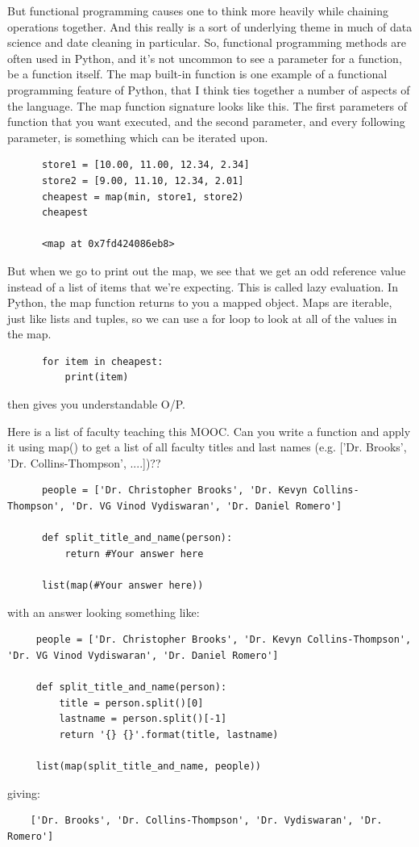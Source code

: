\documentclass[11pt]{article}
\begin{document}
    But functional programming causes one to think more heavily while
    chaining operations together. And this really is a sort of underlying
    theme in much of data science and date cleaning in particular. So,
    functional programming methods are often used in Python, and it's not
    uncommon to see a parameter for a function, be a function itself. The
    map built-in function is one example of a functional programming
    feature of Python, that I think ties together a number of aspects of
    the language. The map function signature looks like this. The first
    parameters of function that you want executed, and the second
    parameter, and every following parameter, is something which can be
    iterated upon.

    \begin{lstlisting}
      store1 = [10.00, 11.00, 12.34, 2.34]
      store2 = [9.00, 11.10, 12.34, 2.01]
      cheapest = map(min, store1, store2)
      cheapest

      <map at 0x7fd424086eb8>
    \end{lstlisting}
    But when we go to print out the map, we see that we get an odd
    reference value instead of a list of items that we're expecting. This
    is called lazy evaluation. In Python, the map function returns to you
    a mapped object. Maps are iterable, just like lists and tuples, so we
    can use a for loop to look at all of the values in the map.

    \begin{lstlisting}
      for item in cheapest:
          print(item)
    \end{lstlisting}
    then gives you understandable O/P. 

    \newpage
    \medskip\medskip
    \noindent
    Here is a list of faculty teaching this MOOC. Can you write a
    function and apply it using map() to get a list of all faculty titles
    and last names (e.g. ['Dr. Brooks', 'Dr. Collins-Thompson', ....])??
    \begin{lstlisting}
      people = ['Dr. Christopher Brooks', 'Dr. Kevyn Collins-Thompson', 'Dr. VG Vinod Vydiswaran', 'Dr. Daniel Romero']
      
      def split_title_and_name(person):
          return #Your answer here

      list(map(#Your answer here))
    \end{lstlisting}

    \noindent 
    with an answer looking something like:
    \begin{lstlisting}
     people = ['Dr. Christopher Brooks', 'Dr. Kevyn Collins-Thompson', 'Dr. VG Vinod Vydiswaran', 'Dr. Daniel Romero']
      
     def split_title_and_name(person):
         title = person.split()[0]
         lastname = person.split()[-1]
         return '{} {}'.format(title, lastname)

     list(map(split_title_and_name, people))
    \end{lstlisting}
    giving:
    \begin{lstlisting}
    ['Dr. Brooks', 'Dr. Collins-Thompson', 'Dr. Vydiswaran', 'Dr. Romero']
    \end{lstlisting}
\end{document}
